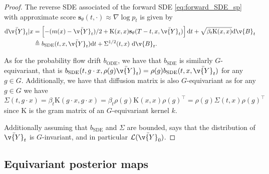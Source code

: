 \begin{proof}
	The reverse SDE associated of the forward SDE \eqref{eq:forward_SDE_sp} with approximate score $\mathbf{s}_\theta(t, \cdot) \approx \nabla \log p_t$ is given by \begin{align}\label{eq:backward_SDE_sp_approx2} \mathrm{d} \bar{\v{Y}}_t|x & = \left[-(m(x) - \bar{\v{Y}}_t)/2 + \mathrm{K}(x,x) \mathbf{s}_\theta(T - t, x, \bar{\v{Y}}_t) \right] \mathrm{d} t + \sqrt{\beta_t \mathrm{K}(x,x)} \mathrm{d} \v{B}_t \\ &\triangleq b_{\text{SDE}}(t, x, \bar{\v{Y}}_t) \mathrm{d} t + \Sigma^{1/2}(t, x) ~\mathrm{d} \v{B}_t.
	\end{align}

	As for the probability flow drift $b_{\text{ODE}}$, we have that $b_{\text{SDE}}$ is similarly $G$-equivariant, that is $b_{\text{SDE}}(t, g\cdot x, \rho(g) \bar{\v{Y}}_t) = \rho(g) b_{\text{SDE}}(t, x, \bar{\v{Y}}_t)$ for any $g \in G$.
	Additionally, we have that diffusion matrix is also $G$-equivariant as for any $g \in G$ we have $\Sigma(t, g \cdot x) = \beta_t \mathrm{K}(g \cdot x, g \cdot x) = \beta_t \rho(g) \mathrm{K}(x, x) \rho(g)^\top = \rho(g) \Sigma(t, x) \rho(g)^\top$ since $\mathrm{K}$ is the gram matrix of an $G$-equivariant kernel $k$.

	Additionally assuming that $b_{\text{SDE}}$ and $\Sigma$ are bounded, \textcite[Proposition 3.6,][]{yim2023se} says that the distribution of $\bar{\v{Y}}_t$ is $G$-invariant, and in particular $\mathcal{L}(\bar{\v{Y}}_0)$.

\end{proof}

\subsection{Equivariant posterior maps}
\label{sec:equiv_posterior}
\label{sec:proof_equiv_posterior}

\def\phiA{\phi_{*, \c{A}}}
\def\iso{\operatorname{Isom}}

